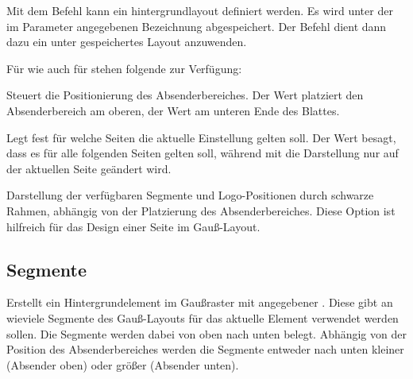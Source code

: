Mit dem Befehl  kann ein hintergrundlayout definiert werden.
Es wird unter der im Parameter  angegebenen Bezeichnung
abgespeichert.
Der Befehl  dient dann dazu ein unter  gespeichertes
Layout anzuwenden.


Für  wie auch für  stehen folgende
 zur Verfügung:

\begin{Declaration}
\end{Declaration}

Steuert die Positionierung des Absenderbereiches.
Der Wert  platziert den Absenderbereich am oberen,
der Wert  am unteren Ende des Blattes.

\begin{Declaration}
\end{Declaration}

Legt fest für welche Seiten die aktuelle Einstellung gelten soll.
Der Wert  besagt, dass es für alle folgenden Seiten gelten soll,
während mit  die Darstellung nur auf der aktuellen Seite geändert 
wird.

\begin{Declaration}
\end{Declaration}

Darstellung der verfügbaren Segmente und Logo-Positionen durch schwarze Rahmen, abhängig von der Platzierung des Absenderbereiches.
Diese Option ist hilfreich für das Design einer Seite im Gauß-Layout.


\subsection{Segmente}\label{subsec:gausspage:bgsegment}

\begin{Declaration}
\end{Declaration}

Erstellt ein Hintergrundelement im Gaußraster mit angegebener .
Diese gibt an wieviele Segmente des Gauß-Layouts für das aktuelle Element
verwendet werden sollen.
Die Segmente werden dabei von oben nach unten belegt.
Abhängig von der Position des Absenderbereiches werden die Segmente
entweder nach unten kleiner (Absender oben) oder größer (Absender unten).

